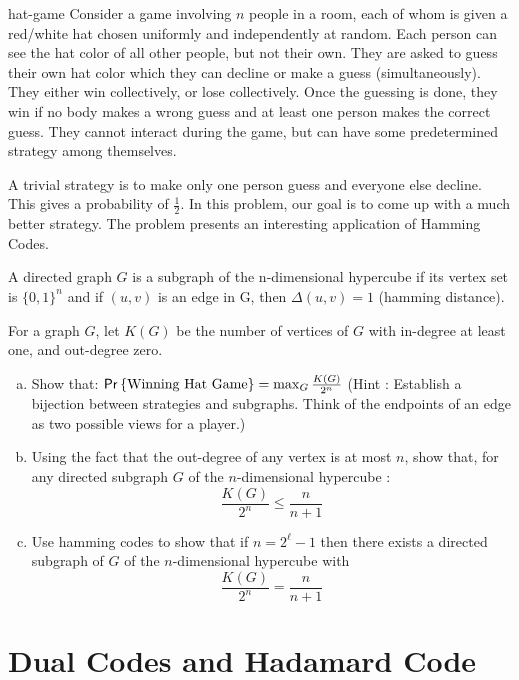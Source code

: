 \begin{exercise-prob}
\begin{show-ps3}{hat-game}   
Consider a game involving $n$ people in a room, each of whom is given a 
red/white hat chosen uniformly and independently at random. 
Each person can see the hat color of all other people, but not their own. 
They are asked to guess their own hat color which they can decline or make a guess (simultaneously).
They either win collectively, or lose collectively. Once the guessing is done, they win if no body makes a wrong guess and at least one person makes the correct guess.
They cannot interact during the game, but can have some predetermined strategy among themselves.

A trivial strategy is to make only one person guess and everyone else decline. This gives a probability of $\frac{1}{2}$.
In this problem, our goal is to come up with a much better strategy. The problem presents an interesting application of Hamming Codes.

A directed graph $G$ is a subgraph of the n-dimensional hypercube if its vertex set is $\{0,1\}^n$ and if $(u ,v)$ is an edge in G, then $\Delta(u,v) = 1$ (hamming distance).

For a graph $G$, let $K(G)$ be the number of vertices of $G$ with in-degree at least one, and out-degree zero.

\begin{enumerate}[(a)]
\item Show that: ${\sf Pr} \left\{ \textrm{Winning Hat Game} \right\} = \max_G \frac{K(G)}{2^n}$
(Hint : Establish a bijection between strategies and subgraphs. Think of the endpoints of an edge as two possible views for a player.)
\item Using the fact that the out-degree of any vertex is at most $n$, show that, for any directed subgraph $G$ of the $n$-dimensional hypercube :
\[ \frac{K(G)}{2^n} \le \frac{n}{n+1} \]
\item Use hamming codes to show that if $n = 2^\ell-1$ then there exists a directed subgraph of $G$ of the $n$-dimensional hypercube with 
$$\frac{K(G)}{2^n} = \frac{n}{n+1}$$
\end{enumerate}
\end{show-ps3}
\end{exercise-prob}

\section{Dual Codes and Hadamard Code}

